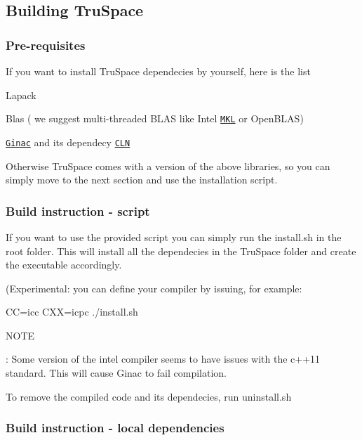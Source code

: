 \subsection*{Building Tru\+Space }

\subsubsection*{Pre-\/requisites}

If you want to install Tru\+Space dependecies by yourself, here is the list


\begin{DoxyItemize}
\item Lapack
\item Blas ( we suggest multi-\/threaded B\+L\+AS like Intel \href{https://software.intel.com/en-us/intel-mkl}{\tt M\+KL} or Open\+B\+L\+AS)
\item \href{http://www.ginac.de/}{\tt Ginac} and its dependecy \href{http://www.ginac.de/CLN/}{\tt C\+LN}
\end{DoxyItemize}

Otherwise Tru\+Space comes with a version of the above libraries, so you can simply move to the next section and use the installation script.

\subsubsection*{Build instruction -\/ script}

If you want to use the provided script you can simply run the {\ttfamily install.\+sh} in the root folder. This will install all the dependecies in the Tru\+Space folder and create the executable accordingly.

(Experimental\+: you can define your compiler by issuing, for example\+: \begin{DoxyVerb}CC=icc CXX=icpc ./install.sh
\end{DoxyVerb}


N\+O\+TE

\+: Some version of the intel compiler seems to have issues with the c++11 standard. This will cause Ginac to fail compilation.

To remove the compiled code and its dependecies, run {\ttfamily uninstall.\+sh}

\subsubsection*{Build instruction -\/ local dependencies}


